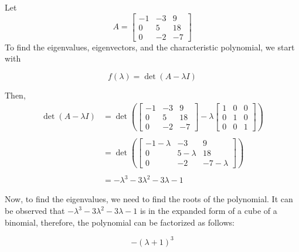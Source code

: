 \documentclass{report}
\begin{document}
    \begin{Example}
        Let
        $$A = \begin{bmatrix}
            -1 & -3 & 9\\
            0 & 5 & 18\\
            0 & -2 & -7
        \end{bmatrix}$$
        To find the eigenvalues, eigenvectors, and the characteristic polynomial, we start with

        $$f(\lambda) = \det\left(A - \lambda I\right)$$

        Then, \begin{align*}
            \det\left(A - \lambda I\right) &= \det\left(
                \begin{bmatrix}
                    -1 & -3 & 9\\
                    0 & 5 & 18\\
                    0 & -2 & -7
                \end{bmatrix}
            - \lambda
                \begin{bmatrix}
                    1 & 0 & 0\\
                    0 & 1 & 0\\
                    0 & 0 & 1
                \end{bmatrix}
            \right)\\\\
            &= \det\left(
                \begin{bmatrix}
                    -1-\lambda & -3 & 9\\
                    0 & 5-\lambda & 18\\
                    0 & -2 & -7-\lambda
                \end{bmatrix}
            \right)\\\\
            &= -\lambda^3 -3\lambda^2 -3\lambda -1
        \end{align*}

        Now, to find the eigenvalues, we need to find the roots of the polynomial. It can be observed that $-\lambda^3 -3\lambda^2 -3\lambda -1$ is in the expanded form of a cube of a binomial, therefore, the polynomial can be factorized as follows:

        $$-(\lambda + 1)^3$$


\end{Example}
\end{document}
